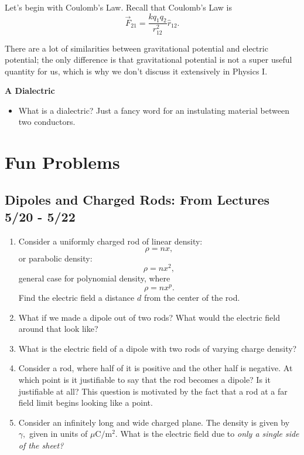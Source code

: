 \documentclass[12pt]{extreport}
\begin{document}
	Let's begin with Coulomb's Law. Recall that Coulomb's Law is $$\vec F_{21} = \frac{k q_1 q_2}{r_{12}^2} \hat r_{12}.$$

	There are a lot of similarities between gravitational potential and electric potential; the only difference is that gravitational potential is not a super useful quantity for us, which is why we don't discuss it extensively in Physics I.

	\textbf{A Dialectric}
		\begin{itemize}
			\item What is a dialectric? Just a fancy word for an instulating material between two conductors.
		\end{itemize}



\chapter{Fun Problems}
\section{Dipoles and Charged Rods: From Lectures 5/20 - 5/22}
	\begin{enumerate}
		\item
		Consider a uniformly charged rod of linear density: $$\rho = nx,$$ or parabolic density: $$\rho = nx^2,$$ general case for polynomial density, where $$\rho = nx^p.$$ Find the electric field a distance $d$ from the center of the rod. 

		\item
		What if we made a dipole out of two rods? What would the electric field around that look like?

		\item
		What is the electric field of a dipole with two rods of varying charge density?

		\item
		Consider a rod, where half of it is positive and the other half is negative. At which point is it justifiable to say that the rod becomes a dipole? Is it justifiable at all? This question is motivated by the fact that a rod at a far field limit begins looking like a point.

		\item
		Consider an infinitely long and wide charged plane. The density is given by $\gamma,$ given in units of $\mu$C$/$m$^2.$ What is the electric field due to \textit{only a single side of the sheet?}

	\end{enumerate}
\end{document}

